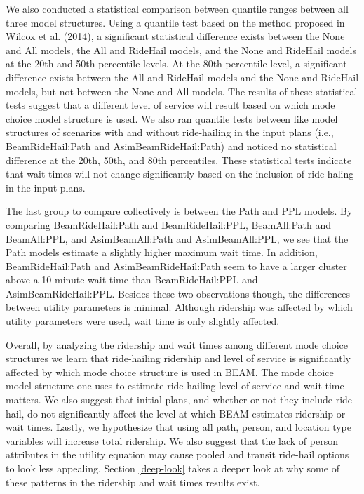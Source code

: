\documentclass[fancy, masters]{byuthesis}
\begin{document}
We also conducted a statistical comparison between quantile ranges between all three model structures. Using a quantile test based on the method proposed in Wilcox et al. (2014), a significant statistical difference exists between the None and All models, the All and RideHail models, and the None and RideHail models at the 20th and 50th percentile levels. At the 80th percentile level, a significant difference exists between the All and RideHail models and the None and RideHail models, but not between the None and All models. The results of these statistical tests suggest that a different level of service will result based on which mode choice model structure is used. We also ran quantile tests between like model structures of scenarios with and without ride-hailing in the input plans (i.e., BeamRideHail:Path and AsimBeamRideHail:Path) and noticed no statistical difference at the 20th, 50th, and 80th percentiles. These statistical tests indicate that wait times will not change significantly based on the inclusion of ride-haling in the input plans.

The last group to compare collectively is between the Path and PPL models. By comparing BeamRideHail:Path and BeamRideHail:PPL, BeamAll:Path and BeamAll:PPL, and AsimBeamAll:Path and AsimBeamAll:PPL, we see that the Path models estimate a slightly higher maximum wait time. In addition, BeamRideHail:Path and AsimBeamRideHail:Path seem to have a larger cluster above a 10 minute wait time than BeamRideHail:PPL and AsimBeamRideHail:PPL. Besides these two observations though, the differences between utility parameters is minimal. Although ridership was affected by which utility parameters were used, wait time is only slightly affected.

Overall, by analyzing the ridership and wait times among different mode choice structures we learn that ride-hailing ridership and level of service is significantly affected by which mode choice structure is used in BEAM. The mode choice model structure one uses to estimate ride-hailing level of service and wait time matters. We also suggest that initial plans, and whether or not they include ride-hail, do not significantly affect the level at which BEAM estimates ridership or wait times. Lastly, we hypothesize that using all path, person, and location type variables will increase total ridership. We also suggest that the lack of person attributes in the utility equation may cause pooled and transit ride-hail options to look less appealing. Section \ref{deep-look} takes a deeper look at why some of these patterns in the ridership and wait times results exist.
\end{document}
